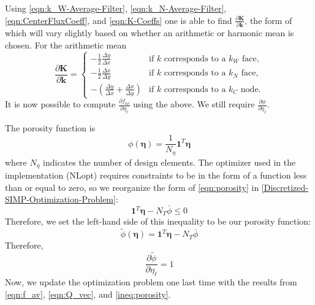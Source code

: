 Using \eqref{eqn:k_W-Average-Filter}, \eqref{eqn:k_N-Average-Filter}, \eqref{eqn:CenterFluxCoeff}, and \eqref{eqn:K-Coeffs} one is able to find $\frac{\partial\mathbf{K}}{\partial\mathbf{k}}$, the form of which will vary slightly based on whether an arithmetic or harmonic mean is chosen. For the arithmetic mean
\begin{equation}
	\frac{\partial\mathbf{K}}{\partial\mathbf{k}}=
	\begin{cases}
		-\frac{1}{2}\frac{\Delta y}{\Delta x} & \text{if }k\text{ corresponds to a }k_W\text{ face},\\
		-\frac{1}{2}\frac{\Delta x}{\Delta y} & \text{if }k\text{ corresponds to a }k_N\text{ face},\\
		-\left(\frac{\Delta y}{\Delta x}+\frac{\Delta x}{\Delta y}\right) & \text{if }k\text{ corresponds to a }k_C\text{ node}.
	\end{cases}
\end{equation}
It is now possible to compute $\displaystyle\frac{\partial f_{av}}{\partial\eta_{\ell}}$ using the above. We still require $\displaystyle\frac{\partial\phi}{\partial\eta_{\ell}}$.

The porosity function is
\begin{equation}
	\phi(\boldsymbol{\eta})=\frac{1}{N_\eta}\mathbf{1}^T\boldsymbol{\eta}\label{eqn:porosity}
\end{equation}
where $N_\eta$ indicates the number of design elements. The optimizer used in the implementation (NLopt) requires constraints to be in the form of a function less than or equal to zero, so we reorganize the form of \eqref{eqn:porosity} in \eqref{Discretized-SIMP-Optimization-Problem}:
\begin{equation}
	\mathbf{1}^T\boldsymbol{\eta}-N_{T}\overline{\phi}\leq 0\label{ineq:porosity}
\end{equation}
Therefore, we set the left-hand side of this inequality to be our porosity function:
\begin{equation}
	\tilde{\phi}\left(\boldsymbol{\eta}\right)=\mathbf{1}^T\boldsymbol{\eta}-N_T\overline{\phi}\label{eqn:modified-porosity}
\end{equation}
Therefore,
\begin{equation}
	\frac{\partial\tilde{\phi}}{\partial\eta_{\ell}}=1\label{eqn:partial-por}
\end{equation}
Now, we update the optimization problem one last time with the results from \eqref{eqn:f_av}, \eqref{eqn:Q_vec}, and \eqref{ineq:porosity}.

